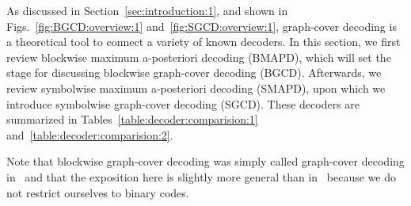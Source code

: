 \documentclass[journal, twocolumn]{IEEEtran}
\newcommand{\?}{\mathrm{?}}
\begin{document}
As discussed in Section~\ref{sec:introduction:1}, and shown in
Figs.~\ref{fig:BGCD:overview:1} and~\ref{fig:SGCD:overview:1}, graph-cover
decoding is a theoretical tool to connect a variety of known decoders. In this
section, we first review blockwise maximum a-posteriori decoding (BMAPD),
which will set the stage for discussing blockwise graph-cover decoding
(BGCD). Afterwards, we review symbolwise maximum a-posteriori decoding
(SMAPD), upon which we introduce symbolwise graph-cover decoding (SGCD). These
decoders are summarized in Tables~\ref{table:decoder:comparision:1}
and~\ref{table:decoder:comparision:2}.

Note that blockwise graph-cover decoding was simply called graph-cover
decoding in~\cite[Sec.~4]{Vontobel:Koetter:05:1:subm} and that the exposition
here is slightly more general than in~\cite{Vontobel:Koetter:05:1:subm}
because we do not restrict ourselves to binary codes.
\end{document}
